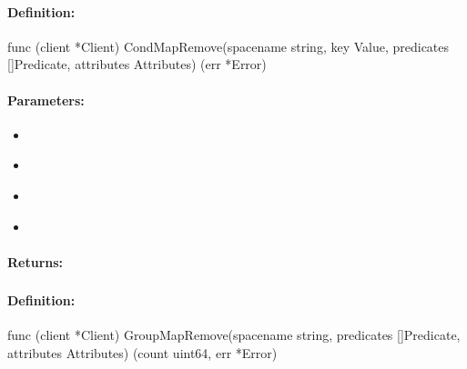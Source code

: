 \paragraph{Definition:}
\begin{gocode}
func (client *Client) CondMapRemove(spacename string, key Value, predicates []Predicate, attributes Attributes) (err *Error)
\end{gocode}

\paragraph{Parameters:}
\begin{itemize}[noitemsep]
\item {}\\

\item {}\\

\item {}\\

\item {}\\

\end{itemize}

\paragraph{Returns:}


\pagebreak
\subsubsection{}
\label{api:Go:GroupMapRemove}


\paragraph{Definition:}
\begin{gocode}
func (client *Client) GroupMapRemove(spacename string, predicates []Predicate, attributes Attributes) (count uint64, err *Error)
\end{gocode}

